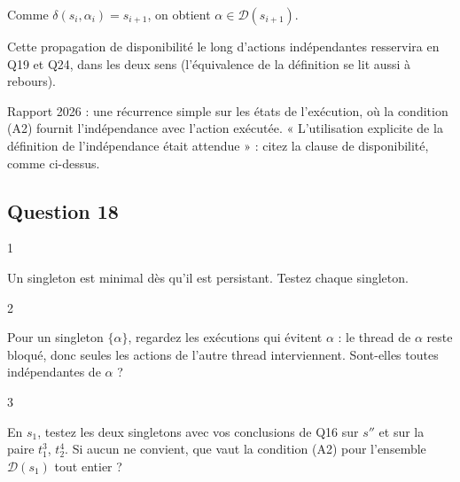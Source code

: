\documentclass[11pt,a4paper]{article}
\newcommand{\equationajustee}[1]{%
  \sbox{\boiteequation}{$\displaystyle #1$}%
  \ifdim\wd\boiteequation>\linewidth
    \[\resizebox{\linewidth}{!}{\usebox{\boiteequation}}\]%
  \else
    \[#1\]%
  \fi}
\begin{document}
\equationajustee{\alpha\in\mathcal D(s_i)\iff\alpha\in\mathcal D(\delta(s_i,\alpha_i)).}

Comme \(\delta(s_i,\alpha_i)=s_{i+1}\), on obtient \(\alpha\in\mathcal D(s_{i+1})\).

\equationajustee{\boxed{\alpha\in\mathcal D(s_i)\ \text{pour tout } i\le n+1}}

\begin{methode}

Cette propagation de disponibilité le long d'actions indépendantes resservira en Q19 et Q24, dans les deux sens (l'équivalence de la définition se lit aussi à rebours).

\end{methode}

\begin{jury}

Rapport 2026 : une récurrence simple sur les états de l'exécution, où la condition (A2) fournit l'indépendance avec l'action exécutée. « L'utilisation explicite de la définition de l'indépendance était attendue » : citez la clause de disponibilité, comme ci-dessus.

\end{jury}

\hypertarget{question-18}{%
\subsection{Question 18}\label{question-18}}

\begin{indication}{1}

Un singleton est minimal dès qu'il est persistant. Testez chaque singleton.

\end{indication}

\begin{indication}{2}

Pour un singleton \(\{\alpha\}\), regardez les exécutions qui évitent \(\alpha\) : le thread de \(\alpha\) reste bloqué, donc seules les actions de l'autre thread interviennent. Sont-elles toutes indépendantes de \(\alpha\) ?

\end{indication}

\begin{indication}{3}

En \(s_1\), testez les deux singletons avec vos conclusions de Q16 sur \(s''\) et sur la paire \(t_1^3\), \(t_2^4\). Si aucun ne convient, que vaut la condition (A2) pour l'ensemble \(\mathcal D(s_1)\) tout entier ?

\end{indication}
\end{document}
